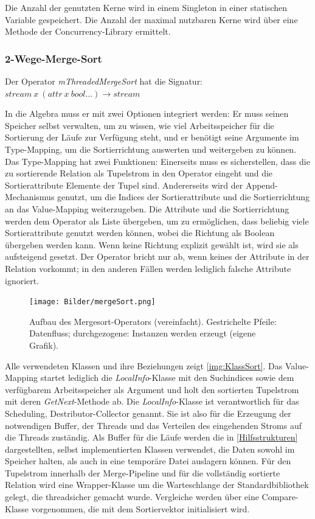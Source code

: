 \documentclass[a4paper,12pt,twoside]{article}
\newcommand{\Fb}[1]{\textit{#1}} %
\begin{document}
Die Anzahl der genutzten Kerne wird in einem Singleton in einer statischen Variable gespeichert. Die Anzahl der maximal nutzbaren Kerne wird über eine Methode der Concurrency-Library ermittelt.

\subsubsection{2-Wege-Merge-Sort}

Der Operator \Fb{mThreadedMergeSort} hat die Signatur: \newline
$stream~x~(attr~x~bool \ldots) \longrightarrow stream$
 
In die Algebra muss er mit zwei Optionen integriert werden: Er muss seinen Speicher selbst verwalten, um zu wissen, wie viel Arbeitsspeicher für die Sortierung der Läufe zur Verfügung steht, und er benötigt seine Argumente im Type-Mapping, um die Sortierrichtung auswerten und weitergeben zu können. Das Type-Mapping hat zwei Funktionen: Einerseits muss es sicherstellen, dass die zu sortierende Relation als Tupelstrom in den Operator eingeht und die Sortierattribute Elemente der Tupel sind. Andererseits wird der Append-Mechanismus genutzt, um die Indices der Sortierattribute und die Sortierrichtung an das Value-Mapping weiterzugeben. Die Attribute und die Sortierrichtung werden dem Operator als Liste übergeben, um zu ermöglichen, dass beliebig viele Sortierattribute genutzt werden können, wobei die Richtung als Boolean übergeben werden kann. Wenn keine Richtung explizit gewählt ist, wird sie als aufsteigend gesetzt. Der Operator bricht nur ab, wenn keines der Attribute in der Relation vorkommt; in den anderen Fällen werden lediglich falsche Attribute ignoriert. 

\begin{figure}
	\centering
	\texttt{[image: Bilder/mergeSort.png]}
	\caption{Aufbau des Mergesort-Operators (vereinfacht). Gestrichelte Pfeile: Datenfluss; durchgezogene: Instanzen werden erzeugt (eigene Grafik).}
	\label{img:KlassSort}
\end{figure}

Alle verwendeten Klassen und ihre Beziehungen zeigt \autoref{img:KlassSort}. Das Value-Mapping startet lediglich die \Fb{LocalInfo}-Klasse mit den Suchindices sowie dem verfügbarem Arbeitsspeicher als Argument und holt den sortierten Tupelstrom mit deren \Fb{GetNext}-Methode ab. Die \Fb{LocalInfo}-Klasse ist verantwortlich für das Scheduling, Destributor-Collector genannt. Sie ist also für die Erzeugung der notwendigen Buffer, der Threads und das Verteilen des eingehenden Stroms auf die Threads zuständig. Als Buffer für die Läufe werden die in \autoref{Hilfsstrukturen} dargestellten, selbst implementierten Klassen verwendet, die Daten sowohl im Speicher halten, als auch in eine temporäre Datei auslagern können. Für den Tupelstrom innerhalb der Merge-Pipeline und für die vollständig sortierte Relation wird eine Wrapper-Klasse um die Warteschlange der Standardbibliothek gelegt, die threadsicher gemacht wurde. Vergleiche werden über eine Compare-Klasse vorgenommen, die mit dem Sortiervektor initialisiert wird.
\end{document}
